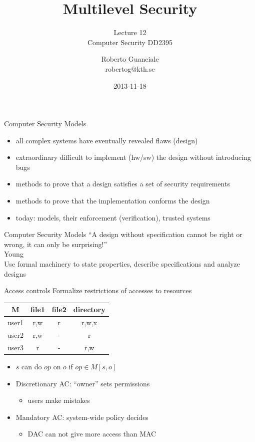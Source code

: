 \documentclass{beamer}
\title{Multilevel Security}
\subtitle{Lecture 12 \\ Computer Security DD2395}
\author[R. Guanciale]{
  Roberto Guanciale\\
  robertog@kth.se
}
\date{2013-11-18}
\begin{document}
\begin{frame}[plain]
  \titlepage
\end{frame}

\begin{frame}{Computer Security Models}
  \begin{itemize}
  \item all complex systems have eventually revealed flaws (design)
  \item extraordinary difficult to implement (hw/sw) the design
    without introducing bugs
  \item methods to prove that a design satisfies a set of security requirements
  \item methods to prove that the implementation conforms the design
  \item today: models, their enforcement (verification), trusted systems
  \end{itemize}
\end{frame}

\begin{frame}{Computer Security Models}
``A design without specification cannot be right or wrong,
  it can only be surprising!''
  \\
  Young
  \\
  Use formal machinery to state properties, describe specifications
  and analyze designs
\end{frame}


\begin{frame}{Access controls}
  Formalize restrictions of accesses to resources\\[10pt]
\begin{center}
  \begin{tabular}{|c|c|c|c|}
    \hline
    M & file1 & file2 & directory \\
    \hline
    user1 & r,w & r & r,w,x \\
    \hline
    user2 & r,w & - & r \\
    \hline
    user3 & r & - & r,w \\
    \hline
  \end{tabular}
\end{center}
  \begin{itemize}
  \item $s$ can do $op$ on $o$ if $op \in M[s,o]$
  \item Discretionary AC: ``owner'' sets permissions
    \begin{itemize}
      \item users make mistakes
    \end{itemize}
  \item<2-> Mandatory AC: system-wide policy decides
    \begin{itemize}
      \item DAC can not give more access than MAC
    \end{itemize}
  \end{itemize}
\end{frame}
\end{document}
